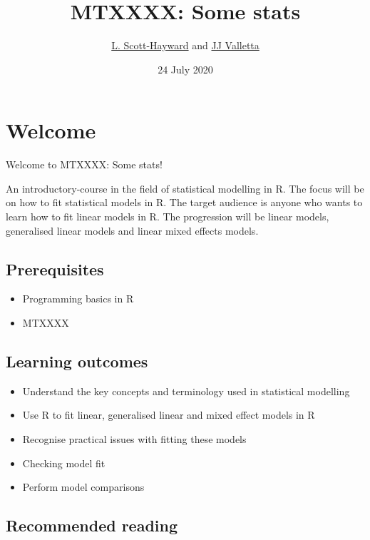 \documentclass[
  oneside]{krantz}
\title{MTXXXX: Some stats}
\author{\href{lass@st-andrews.ac.uk}{L. Scott-Hayward} and \href{jjv1@st-andrews.ac.uk}{JJ Valletta}}
\date{24 July 2020}
\providecommand{\tightlist}{%
  \setlength{\itemsep}{0pt}\setlength{\parskip}{0pt}}
\theoremstyle{definition}
\theoremstyle{definition}
\theoremstyle{definition}
\theoremstyle{remark}
\begin{document}
\maketitle

{
\hypersetup{linkcolor=}
\setcounter{tocdepth}{2}
\tableofcontents
}
\hypertarget{welcome}{%
\chapter*{Welcome}\label{welcome}}


Welcome to MTXXXX: Some stats!

An introductory-course in the field of statistical modelling in R. The focus will be on how to fit statistical models in R. The target audience is anyone who wants to learn how to fit linear models in R. The progression will be linear models, generalised linear models and linear mixed effects models.

\hypertarget{prerequisites}{%
\section*{Prerequisites}\label{prerequisites}}


\begin{itemize}
\tightlist
\item
  Programming basics in R
\item
  MTXXXX
\end{itemize}

\hypertarget{learning-outcomes}{%
\section*{Learning outcomes}\label{learning-outcomes}}


\begin{itemize}
\tightlist
\item
  Understand the key concepts and terminology used in statistical modelling
\item
  Use R to fit linear, generalised linear and mixed effect models in R
\item
  Recognise practical issues with fitting these models
\item
  Checking model fit
\item
  Perform model comparisons
\end{itemize}

\hypertarget{recommended-reading}{%
\section*{Recommended reading}\label{recommended-reading}}
\end{document}
